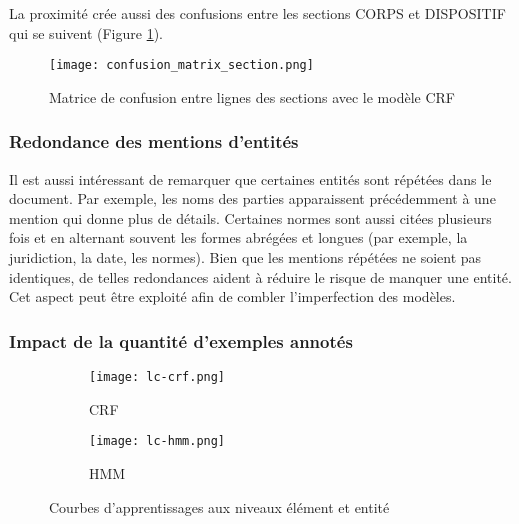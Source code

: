  La proximité crée aussi des confusions entre les sections CORPS et DISPOSITIF qui se suivent (Figure \ref{fig:structuration:matrice-confusion-section}). 

\begin{figure}[h!]
	\centering
	\texttt{[image: confusion\_matrix\_section.png]}
	\caption{Matrice de confusion entre lignes des sections avec le modèle CRF}
	\label{fig:structuration:matrice-confusion-section}
\end{figure}

\subsubsection{Redondance des mentions d'entités}
Il est aussi intéressant de remarquer que certaines entités sont répétées dans le document. Par exemple, les noms des parties apparaissent précédemment à une mention qui donne plus de détails. Certaines normes sont aussi citées plusieurs fois et en alternant souvent les formes abrégées et longues (par exemple, la juridiction, la date, les normes). Bien que les mentions répétées ne soient pas identiques, de telles redondances aident à réduire le risque de manquer une entité. %
Cet aspect peut être exploité afin de combler l'imperfection des modèles.


\subsubsection{Impact de la quantité d'exemples annotés}
\begin{figure}[!h]
	\centering
	\begin{subfigure}[t]{0.95\textwidth}
		\centering
		\texttt{[image: lc-crf.png]}
		\caption{CRF} \label{fig:structuration:learning-curves-crf}
	\end{subfigure} 
	
	\begin{subfigure}[t]{0.95\textwidth}
		\centering
		\texttt{[image: lc-hmm.png]}
		\caption{HMM} \label{fig:structuration:learning-curves-hmm}
	\end{subfigure}
	\caption{Courbes d'apprentissages aux niveaux élément et entité} \label{fig:structuration:learning-curves}
\end{figure}

